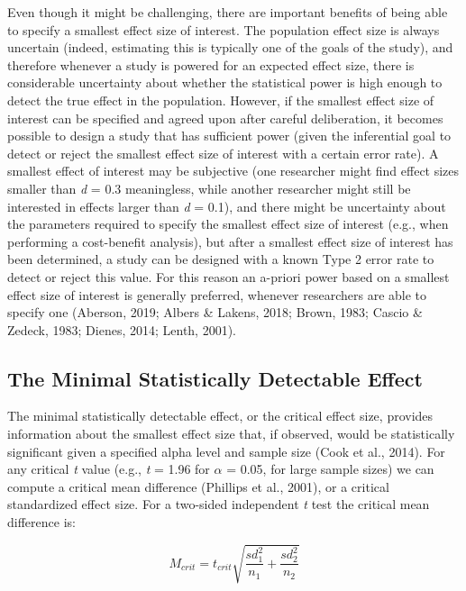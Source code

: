 \documentclass[
  english,
  ,jou, a4paper,floatsintext]{apa6}
\begin{document}
Even though it might be challenging, there are important benefits of being able to specify a smallest effect size of interest. The population effect size is always uncertain (indeed, estimating this is typically one of the goals of the study), and therefore whenever a study is powered for an expected effect size, there is considerable uncertainty about whether the statistical power is high enough to detect the true effect in the population. However, if the smallest effect size of interest can be specified and agreed upon after careful deliberation, it becomes possible to design a study that has sufficient power (given the inferential goal to detect or reject the smallest effect size of interest with a certain error rate). A smallest effect of interest may be subjective (one researcher might find effect sizes smaller than \emph{d} = 0.3 meaningless, while another researcher might still be interested in effects larger than \emph{d} = 0.1), and there might be uncertainty about the parameters required to specify the smallest effect size of interest (e.g., when performing a cost-benefit analysis), but after a smallest effect size of interest has been determined, a study can be designed with a known Type 2 error rate to detect or reject this value. For this reason an a-priori power based on a smallest effect size of interest is generally preferred, whenever researchers are able to specify one (Aberson, 2019; Albers \& Lakens, 2018; Brown, 1983; Cascio \& Zedeck, 1983; Dienes, 2014; Lenth, 2001).

\hypertarget{the-minimal-statistically-detectable-effect}{%
\subsection{The Minimal Statistically Detectable Effect}\label{the-minimal-statistically-detectable-effect}}

The minimal statistically detectable effect, or the critical effect size, provides information about the smallest effect size that, if observed, would be statistically significant given a specified alpha level and sample size (Cook et al., 2014). For any critical \emph{t} value (e.g., \emph{t} = 1.96 for \(\alpha\) = 0.05, for large sample sizes) we can compute a critical mean difference (Phillips et al., 2001), or a critical standardized effect size. For a two-sided independent \emph{t} test the critical mean difference is:

\[M_{crit} = t_{crit}{\sqrt{\frac{sd_1^2}{n_1} + \frac{sd_2^2}{n_2}}}\]
\end{document}
